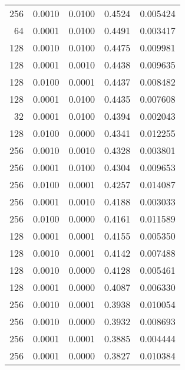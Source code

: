 \begin{tabular}{rrrrr}
 256 &  0.0010 &  0.0100 &  0.4524 &  0.005424 \\
  64 &  0.0001 &  0.0100 &  0.4491 &  0.003417 \\
 128 &  0.0010 &  0.0100 &  0.4475 &  0.009981 \\
 128 &  0.0001 &  0.0010 &  0.4438 &  0.009635 \\
 128 &  0.0100 &  0.0001 &  0.4437 &  0.008482 \\
 128 &  0.0001 &  0.0100 &  0.4435 &  0.007608 \\
  32 &  0.0001 &  0.0100 &  0.4394 &  0.002043 \\
 128 &  0.0100 &  0.0000 &  0.4341 &  0.012255 \\
 256 &  0.0010 &  0.0010 &  0.4328 &  0.003801 \\
 256 &  0.0001 &  0.0100 &  0.4304 &  0.009653 \\
 256 &  0.0100 &  0.0001 &  0.4257 &  0.014087 \\
 256 &  0.0001 &  0.0010 &  0.4188 &  0.003033 \\
 256 &  0.0100 &  0.0000 &  0.4161 &  0.011589 \\
 128 &  0.0001 &  0.0001 &  0.4155 &  0.005350 \\
 128 &  0.0010 &  0.0001 &  0.4142 &  0.007488 \\
 128 &  0.0010 &  0.0000 &  0.4128 &  0.005461 \\
 128 &  0.0001 &  0.0000 &  0.4087 &  0.006330 \\
 256 &  0.0010 &  0.0001 &  0.3938 &  0.010054 \\
 256 &  0.0010 &  0.0000 &  0.3932 &  0.008693 \\
 256 &  0.0001 &  0.0001 &  0.3885 &  0.004444 \\
 256 &  0.0001 &  0.0000 &  0.3827 &  0.010384 \\
\bottomrule
\end{tabular}
